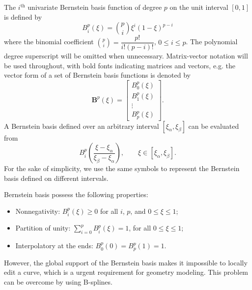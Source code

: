 The $i^{\text{th}}$ univariate Bernstein basis function of degree $p$ on the unit interval $\left[ 0,1 \right]$ is defined by
\begin{equation}
    B_i^p(\xi) = \binom {p}{i}\xi^i(1-\xi)^{p-i}
\end{equation}
where the binomial coefficient $\binom {p}{i}=\dfrac{p!}{i!(p-i)!}$, $0\leq{i}\leq{p}$. The polynomial degree superscript will be omitted when unnecessary. Matrix-vector notation will be used throughout, with bold fonts indicating matrices and vectors, e.g. the vector form of a set of Bernstein basis functions is denoted by
\begin{equation}
    \mathbf{B}^p(\xi)=
    \begin{bmatrix}
        B_0^p(\xi) \\
        B_1^p(\xi) \\
        \vdots     \\
        B_p^p(\xi)
    \end{bmatrix}.
\end{equation}
A Bernstein basis defined over an arbitrary interval $\left[\xi_\alpha,\xi_\beta\right]$ can be evaluated from
\begin{equation}
    B_i^p(\frac{\xi-\xi_\alpha}{\xi_\beta-\xi_\alpha}),\qquad \xi\in\left[\xi_\alpha,\xi_\beta\right].
\end{equation}
For the sake of simplicity, we use the same symbols to represent the Bernstein basis defined on different intervals. \par

Bernstein basis possess the following properties:
\begin{itemize}
    \item Nonnegativity: $B_i^p(\xi)\geq 0$ for all $i$, $p$, and $0\leq\xi\leq 1$;
    \item Partition of unity: $\sum_{i=0}^pB_i^p(\xi)=1$, for all $0\leq\xi\leq 1$;
    \item Interpolatory at the ends: $B_0^p(0)=B_p^p(1)=1$.
\end{itemize}

However, the global support of the Bernstein basis makes it impossible to locally edit a \Bezier curve, which is a urgent requirement for geometry modeling. This problem can be overcome by using B-splines.

